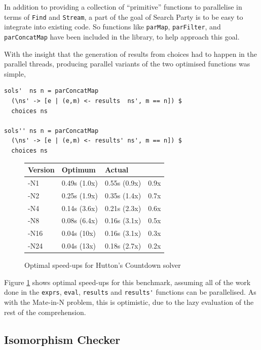 In addition to providing a collection of ``primitive'' functions to
parallelise in terms of \verb|Find| and \verb|Stream|, a part of the
goal of Search Party is to be easy to integrate into existing code.
So functions like \verb|parMap|, \verb|parFilter|, and
\verb|parConcatMap| have been included in the library, to help
approach this goal.

With the insight that the generation of results from choices had to
happen in the parallel threads, producing parallel variants of the two
optimised functions was simple,

\begin{verbatim}
sols'  ns n = parConcatMap
  (\ns' -> [e | (e,m) <- results  ns', m == n]) $
  choices ns

sols'' ns n = parConcatMap
  (\ns' -> [e | (e,m) <- results' ns', m == n]) $
  choices ns
\end{verbatim}

\begin{figure}[t]
  \centering
  \begin{tabularx}{\linewidth}{|X|X|X|X|}
    \hline \textbf{Version} & \textbf{Optimum} & \textbf{Actual} & \\
    \hline -N1  & 0.49s (1.0x) & 0.55s (0.9x) & 0.9x \\
           -N2  & 0.25s (1.9x) & 0.35s (1.4x) & 0.7x \\
           -N4  & 0.14s (3.6x) & 0.21s (2.3x) & 0.6x \\
           -N8  & 0.08s (6.4x) & 0.16s (3.1x) & 0.5x \\
           -N16 & 0.04s (10x)  & 0.16s (3.1x) & 0.3x \\
           -N24 & 0.04s (13x)  & 0.18s (2.7x) & 0.2x \\
    \hline
  \end{tabularx}
  \caption{Optimal speed-ups for Hutton's Countdown solver}
  \label{fig:examples-hutton-amdahl}
\end{figure}

Figure \ref{fig:examples-hutton-amdahl} shows optimal speed-ups for
this benchmark, assuming all of the work done in the \verb|exprs|,
\verb|eval|, \verb|results| and \verb|results'| functions can be
parallelised. As with the Mate-in-N problem, this is optimistic, due
to the lazy evaluation of the rest of the comprehension.

\subsection*{Isomorphism Checker}
\label{sec:prelims-searchparty-examples-isos}

